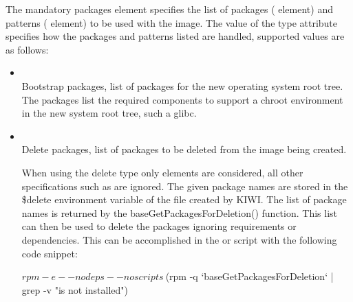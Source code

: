 The mandatory packages element specifies the list of packages ( 
element) and patterns ( element) to be used with the image.
The value of the type attribute specifies how the packages and patterns 
listed are handled, supported values are as follows:

\begin{itemize}
\item {}\\
      Bootstrap packages, list of packages for the new operating system
      root tree. The packages list the required components to support a 
      chroot environment in the new system root tree, such a glibc.
\item {}\\
      Delete packages, list of packages to be deleted from the image being
      created.

      When using the delete type only  elements are considered, all
      other specifications such as  are ignored. The given
      package names are stored in the \$delete environment variable of the 
       file created by KIWI. The list of package names is returned 
      by the baseGetPackagesForDeletion() function. This list can then be
      used to delete the packages ignoring requirements or dependencies. 
      This can be accomplished in the  or  script with
      the following code snippet:
\begin{Command}
$ rpm -e --nodeps --noscripts \
  $(rpm -q `baseGetPackagesForDeletion` | grep -v "is not installed")
\end{Command}


\end{itemize}
